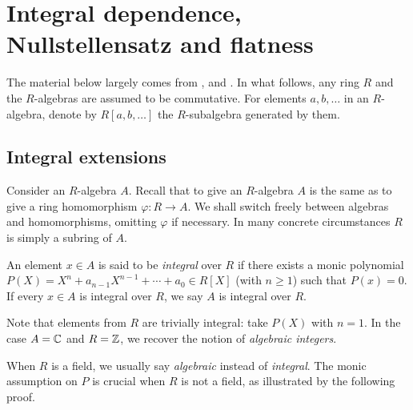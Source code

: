 
\chapter{Integral dependence, Nullstellensatz and flatness}

The material below largely comes from \cite[\S 4]{Eis95}, \cite[V.4]{AK70} and \cite[\S\S 5--6]{Mat80}. In what follows, any ring $R$ and the $R$-algebras are assumed to be commutative. For elements $a,b, \ldots$ in an $R$-algebra, denote by $R[a,b, \ldots]$ the $R$-subalgebra generated by them.

\section{Integral extensions}
Consider an $R$-algebra $A$. Recall that to give an $R$-algebra $A$ is the same as to give a ring homomorphism $\varphi: R \to A$. We shall switch freely between algebras and homomorphisms, omitting $\varphi$ if necessary. In many concrete circumstances $R$ is simply a subring of $A$.

\begin{definition}
	An element $x \in A$ is said to be \emph{integral} over $R$ if there exists a monic polynomial $P(X) = X^n + a_{n-1} X^{n-1} + \cdots + a_0 \in R[X]$ (with $n \geq 1$) such that $P(x)=0$. If every $x \in A$ is integral over $R$, we say $A$ is integral over $R$.
\end{definition}
Note that elements from $R$ are trivially integral: take $P(X)$ with $n=1$. In the case $A = \mathbb{C}$ and $R = \mathbb{Z}$, we recover the notion of \emph{algebraic integers}.

When $R$ is a field, we usually say \emph{algebraic} instead of \emph{integral}. The monic assumption on $P$ is crucial when $R$ is not a field, as illustrated by the following proof.

